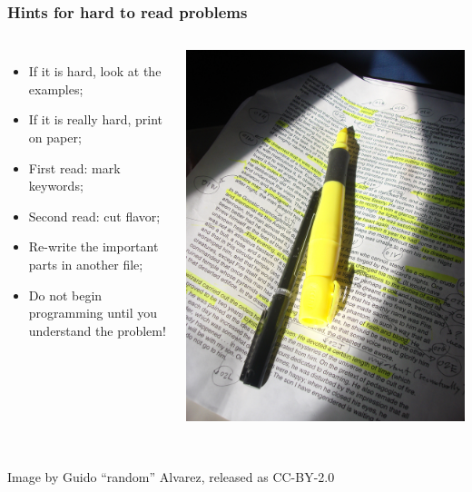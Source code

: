 \documentclass{beamer}
\begin{document}
\begin{frame}
  \frametitle{Hints for hard to read problems}
  
  \begin{columns}
    {\small
    \begin{itemize}
    \item If it is hard, look at the examples;
    \item If it is really hard, print on paper;
    \item First read: mark keywords;
    \item Second read: cut flavor;
    \item Re-write the important parts in another file;
    \item \alert{Do not begin programming until you understand the problem!}
    \end{itemize}
    }
    \includegraphics[width=\textwidth]{../img/textmarker}
  \end{columns}

  \vfill

  \hrulefill\\
  \hfill {\tiny Image by Guido ``random'' Alvarez, released as CC-BY-2.0}

\end{frame}
\end{document}

